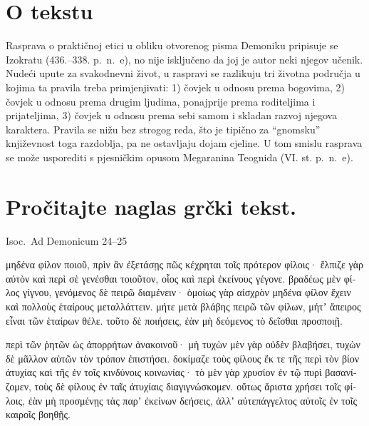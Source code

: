


\section*{O tekstu}

Rasprava o praktičnoj etici u obliku otvorenog pisma Demoniku pripisuje se Izokratu (436.–338. p.~n.~e), no nije isključeno da joj je autor neki njegov učenik. Nudeći upute za svakodnevni život, u raspravi se razlikuju tri životna područja u kojima ta pravila treba primjenjivati: 1) čovjek u odnosu prema bogovima, 2) čovjek u odnosu prema drugim ljudima, ponajprije prema roditeljima i prijateljima, 3) čovjek u odnosu prema sebi samom i skladan razvoj njegova karaktera. Pravila se nižu bez strogog reda, što je tipično za ``gnomsku'' književnost toga razdoblja, pa ne ostavljaju dojam cjeline. U tom smislu rasprava se može usporediti s pjesničkim opusom Megaranina Teognida (VI. st. p.~n.~e).


\section*{Pročitajte naglas grčki tekst.}

Isoc.\ Ad Demonicum 24–25


\medskip


{\large

\begin{greek}

\noindent μηδένα φίλον ποιοῦ, πρὶν ἂν ἐξετάσῃς πῶς κέχρηται τοῖς πρότερον φίλοις· ἔλπιζε γὰρ αὐτὸν καὶ περὶ σὲ γενέσθαι τοιοῦτον, οἷος καὶ περὶ ἐκείνους γέγονε. βραδέως μὲν φίλος γίγνου, γενόμενος δὲ πειρῶ διαμένειν· ὁμοίως γὰρ αἰσχρὸν μηδένα φίλον ἔχειν καὶ πολλοὺς ἑταίρους μεταλλάττειν. μήτε μετὰ βλάβης πειρῶ τῶν φίλων, μήτʼ ἄπειρος εἶναι τῶν ἑταίρων θέλε. τοῦτο δὲ ποιήσεις, ἐὰν μὴ δεόμενος τὸ δεῖσθαι προσποιῇ.

\noindent περὶ τῶν ῥητῶν ὡς ἀπορρήτων ἀνακοινοῦ· μὴ τυχὼν μὲν γὰρ οὐδὲν βλαβήσει, τυχὼν δὲ μᾶλλον αὐτῶν τὸν τρόπον ἐπιστήσει. δοκίμαζε τοὺς φίλους ἔκ τε τῆς περὶ τὸν βίον ἀτυχίας καὶ τῆς ἐν τοῖς κινδύνοις κοινωνίας· τὸ μὲν γὰρ χρυσίον ἐν τῷ πυρὶ βασανίζομεν, τοὺς δὲ φίλους ἐν ταῖς ἀτυχίαις διαγιγνώσκομεν. οὕτως ἄριστα χρήσει τοῖς φίλοις, ἐὰν μὴ προσμένῃς τὰς παρʼ ἐκείνων δεήσεις, ἀλλʼ αὐτεπάγγελτος αὐτοῖς ἐν τοῖς καιροῖς βοηθῇς.

\end{greek}

}


